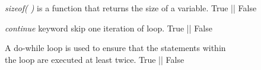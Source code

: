 \documentclass[addpoints,11pt]{exam}
\begin{document}
\begin{questions}
\question[2]
\emph{sizeof( )} is a function that returns the size of a variable.  \space\space\space\space\space\space\space\space\space\space\space True || False

\question[2]
\emph{continue} keyword skip one iteration of loop.  \space\space\space\space\space\space\space\space\space\space\space\space\space\space\space\space\space\space\space\space\space\space\space  True || False 

\question[2]
A do-while loop is used to ensure that the statements within \\ the loop are executed at least twice.  \space\space\space\space\space\space\space\space\space\space\spacespace\space\space\space\space\space\space\space\space\space\space\space\space\space\space\space\space\space\spacespace\space\space\space\space\space\space\space\space\space\space\space\space\space\space True || False

\end{questions}
\end{document}
